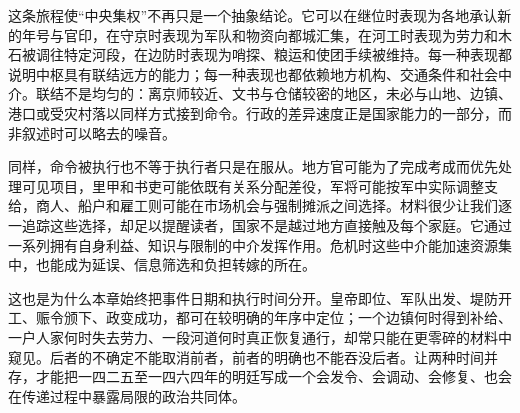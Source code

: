 这条旅程使“中央集权”不再只是一个抽象结论。它可以在继位时表现为各地承认新的年号与官印，在守京时表现为军队和物资向都城汇集，在河工时表现为劳力和木石被调往特定河段，在边防时表现为哨探、粮运和使团手续被维持。每一种表现都说明中枢具有联结远方的能力；每一种表现也都依赖地方机构、交通条件和社会中介。联结不是均匀的：离京师较近、文书与仓储较密的地区，未必与山地、边镇、港口或受灾村落以同样方式接到命令。行政的差异速度正是国家能力的一部分，而非叙述时可以略去的噪音。

同样，命令被执行也不等于执行者只是在服从。地方官可能为了完成考成而优先处理可见项目，里甲和书吏可能依既有关系分配差役，军将可能按军中实际调整支给，商人、船户和雇工则可能在市场机会与强制摊派之间选择。材料很少让我们逐一追踪这些选择，却足以提醒读者，国家不是越过地方直接触及每个家庭。它通过一系列拥有自身利益、知识与限制的中介发挥作用。危机时这些中介能加速资源集中，也能成为延误、信息筛选和负担转嫁的所在。

这也是为什么本章始终把事件日期和执行时间分开。皇帝即位、军队出发、堤防开工、赈令颁下、政变成功，都可在较明确的年序中定位；一个边镇何时得到补给、一户人家何时失去劳力、一段河道何时真正恢复通行，却常只能在更零碎的材料中窥见。后者的不确定不能取消前者，前者的明确也不能吞没后者。让两种时间并存，才能把一四二五至一四六四年的明廷写成一个会发令、会调动、会修复、也会在传递过程中暴露局限的政治共同体。